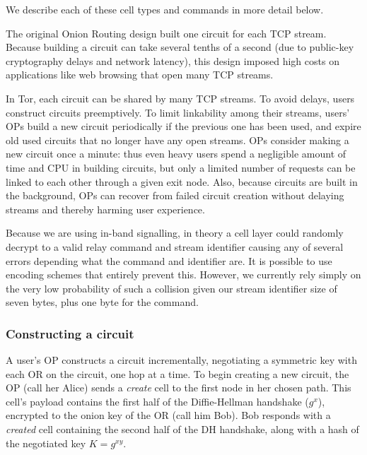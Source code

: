 \documentclass[times,10pt,twocolumn]{article}
\begin{document}
We describe each of these cell types and commands in more detail below.

\label{subsec:circuits}


The original Onion Routing design built one circuit for each
TCP stream.  Because building a circuit can take several tenths of a
second (due to public-key cryptography delays and network latency),
this design imposed high costs on applications like web browsing that
open many TCP streams.

In Tor, each circuit can be shared by many TCP streams.  To avoid
delays, users construct circuits preemptively.  To limit linkability
among their streams, users' OPs build a new circuit
periodically if the previous one has been used,
and expire old used circuits that no longer have any open streams.
OPs consider making a new circuit once a minute: thus
even heavy users spend a negligible amount of time and CPU in
building circuits, but only a limited number of requests can be linked
to each other through a given exit node. Also, because circuits are built
in the background, OPs can recover from failed circuit creation
without delaying streams and thereby harming user experience.

Because we are using in-band signalling, in theory a cell layer could
randomly decrypt to a valid relay command and stream identifier
causing any of several errors depending what the command and
identifier are. It is possible to use encoding schemes that entirely
prevent this. However, we currently rely simply on the very low
probability of such a collision given our stream identifier size of
seven bytes, plus one byte for the command.

\subsubsection{Constructing a circuit}
\label{subsubsec:constructing-a-circuit}


A user's OP constructs a circuit incrementally, negotiating a
symmetric key with each OR on the circuit, one hop at a time. To begin
creating a new circuit, the OP (call her Alice) sends a
\emph{create} cell to the first node in her chosen path. This cell's
payload contains the first half of the Diffie-Hellman handshake
($g^x$), encrypted to the onion key of the OR (call him Bob). Bob
responds with a \emph{created} cell containing the second half of the
DH handshake, along with a hash of the negotiated key $K=g^{xy}$.
\end{document}
